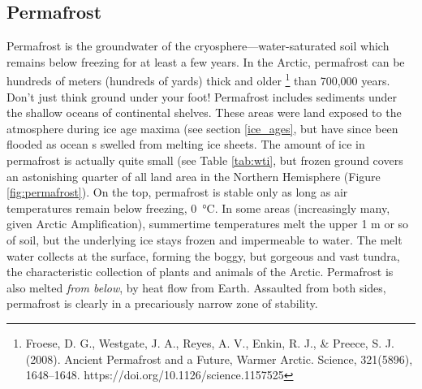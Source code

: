 \documentclass[amstex,12pt]{book}
\begin{document}
\subsection{Permafrost}
Permafrost is the groundwater of the cryosphere---water-saturated soil which remains below freezing for at least a few years. In the Arctic, permafrost can be hundreds of meters (hundreds of yards) thick and older \footnote{Froese, D. G., Westgate, J. A., Reyes, A. V., Enkin, R. J., \& Preece, S. J. (2008). Ancient Permafrost and a Future, Warmer Arctic. Science, 321(5896), 1648–1648. https://doi.org/10.1126/science.1157525} than 700,000 years. Don't just think ground under your foot! Permafrost includes sediments under the shallow oceans of continental shelves. These areas were land exposed to the atmosphere during ice age maxima (see section \ref{ice_ages}, but have since been flooded as ocean s swelled from melting ice sheets. The amount of ice in permafrost is actually quite small (see Table \ref{tab:wti}, but frozen ground covers an astonishing quarter of all land area in the Northern Hemisphere (Figure \ref{fig:permafrost}). On the top, permafrost is stable only as long as air temperatures remain below freezing, \SI{0}{\celsius}. In some areas (increasingly many, given Arctic Amplification), summertime temperatures melt the upper 1 m or so of soil, but the underlying ice stays frozen and impermeable to water. The melt water collects at the surface, forming the boggy, but gorgeous and vast tundra, the characteristic collection of plants and animals of the Arctic. Permafrost is also melted \emph{from below}, by heat flow from Earth. Assaulted from both sides, permafrost is clearly in a precariously narrow zone of stability.\\ 
\end{document}
